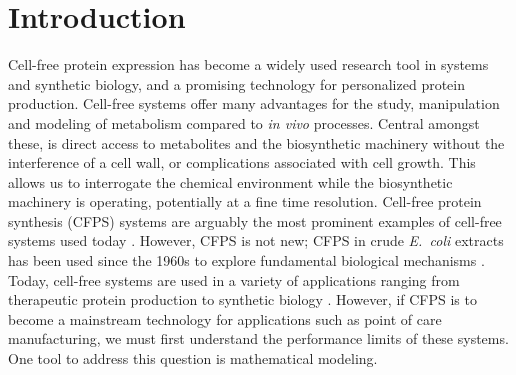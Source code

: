 \documentclass[journal=asbcd6,manuscript=article]{achemso}
\begin{document}
\section{Introduction}
Cell-free protein expression has become a widely used research tool in systems and synthetic biology, and a promising technology for personalized protein production.
Cell-free systems offer many advantages for the study, manipulation and modeling of metabolism compared to \textit{in vivo} processes.
Central amongst these, is direct access to metabolites and the biosynthetic machinery without the interference of a cell wall, or complications associated with cell growth.
This allows us to interrogate the chemical environment while the biosynthetic machinery is operating, potentially at a fine time resolution.
Cell-free protein synthesis (CFPS) systems are arguably the most prominent examples of cell-free systems used today \cite{Jewett:2008aa}.
However, CFPS is not new; CFPS in crude \textit{E.~coli} extracts has been used since the 1960s to explore fundamental biological mechanisms \cite{MATTHAEI:1961aa,NIRENBERG:1961aa}.
Today, cell-free systems are used in a variety of applications ranging from therapeutic protein production \cite{Lu:2014aa} to synthetic biology \cite{Hodgman:2012aa}.
However, if CFPS is to become a mainstream technology for applications such as point of care manufacturing, we must first understand the performance limits of these systems.
One tool to address this question is mathematical modeling.

\end{document}
